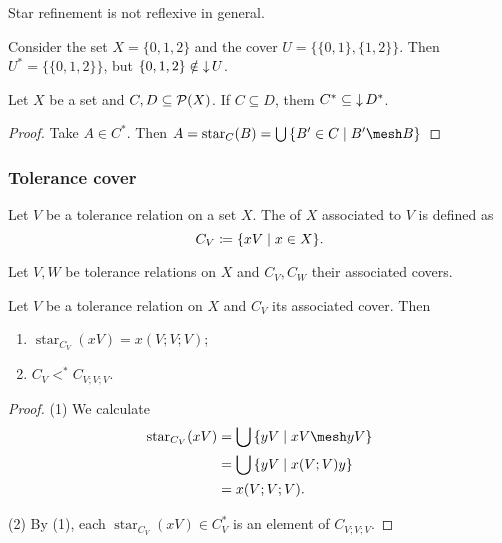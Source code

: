 \begin{example}
Star refinement is not reflexive in general. 

Consider the set $X = \{0,1,2\}$ and the cover $U = \big\{\{0,1\}, \{1,2\}\big\}$. Then $U^* = \big\{\{0,1,2\}\big\}$, but $\{0,1,2\}\notin \operatorname{\downarrow} U$.
\end{example}

\begin{lemma}
Let $X$ be a set and $C,D\subseteq \operatorname{\mathcal{P}}(X)$. If $C\subseteq D$, them $C^*\subseteq \operatorname{\downarrow} D^*$.
\end{lemma}
\begin{proof}
Take $A \in C^*$. Then $A = \operatorname{star}_C(B) = \bigcup \setbuilder{B'\in C}{B'\mesh B}$
\end{proof}

\subsubsection{Tolerance cover}
\begin{definition}
Let $V$ be a tolerance relation on a set $X$. The  of $X$ associated to $V$ is defined as
\[ C_V \defeq \setbuilder{xV}{x\in X}. \]
\end{definition}

\begin{lemma}
Let $V, W$ be tolerance relations on $X$ and $C_V, C_W$ their associated covers.
\end{lemma}

\begin{lemma} \label{toleranceCoverStarRefinement}
Let $V$ be a tolerance relation on $X$ and $C_V$ its associated cover. Then
\begin{enumerate}
\item $\operatorname{star}_{C_V}(xV) = x(V;V;V)$;
\item $C_V <^* C_{V;V;V}$.
\end{enumerate}
\end{lemma}
\begin{proof}
(1) We calculate
\begin{align*}
\operatorname{star}_{C_V}(xV) &= \bigcup \setbuilder{yV}{xV\mesh yV} \\
&= \bigcup \setbuilder{yV}{x(V;V)y} \\
&= x(V;V;V).
\end{align*}

(2) By (1), each $\operatorname{star}_{C_V}(xV)\in C_V^*$ is an element of $C_{V;V;V}$.
\end{proof}

